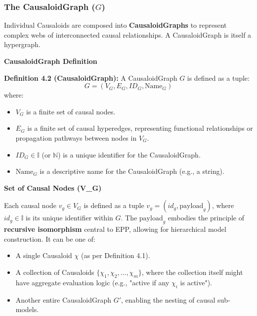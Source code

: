     
    \subsubsection[The CausaloidGraph (\(G\))]{The CausaloidGraph (\(G\))}
    \label{ssec:causaloidgraph_formal} %

    Individual Causaloids are composed into \textbf{CausaloidGraphs} to represent complex webs of interconnected causal relationships. A CausaloidGraph is itself a hypergraph.

    
\textbf{CausaloidGraph Definition}
        
        \textbf{Definition 4.2 (CausaloidGraph):} A CausaloidGraph \( G \) is defined as a tuple:
        \[ G = (V_G, E_G, ID_G, \text{Name}_G) \]
        where:
        \begin{itemize}
            \item \( V_G \) is a finite set of causal nodes.
            \item \( E_G \) is a finite set of causal hyperedges, representing functional relationships or propagation pathways between nodes in \(V_G\).
            \item \( ID_G \in \mathbb{I} \) (or \(\mathbb{N}\)) is a unique identifier for the CausaloidGraph.
            \item \( \text{Name}_G \) is a descriptive name for the CausaloidGraph (e.g., a string).
        \end{itemize}

        
\textbf{Set of Causal Nodes (V\_G)}
        
        Each causal node \( v_g \in V_G \) is defined as a tuple \(v_g = (id_g, \text{payload}_g)\), where \(id_g \in \mathbb{I}\) is its unique identifier within \(G\).
        The \( \text{payload}_g \) embodies the principle of \textbf{recursive isomorphism} central to EPP, allowing for hierarchical model construction. It can be one of:
        \begin{itemize}
            \item A single Causaloid \(\chi\) (as per Definition 4.1).
            \item A collection of Causaloids \(\{\chi_1, \chi_2, \dots, \chi_m\}\), where the collection itself might have aggregate evaluation logic (e.g., "active if any \(\chi_i\) is active").
            \item Another entire CausaloidGraph \(G'\), enabling the nesting of causal sub-models.
        \end{itemize}


